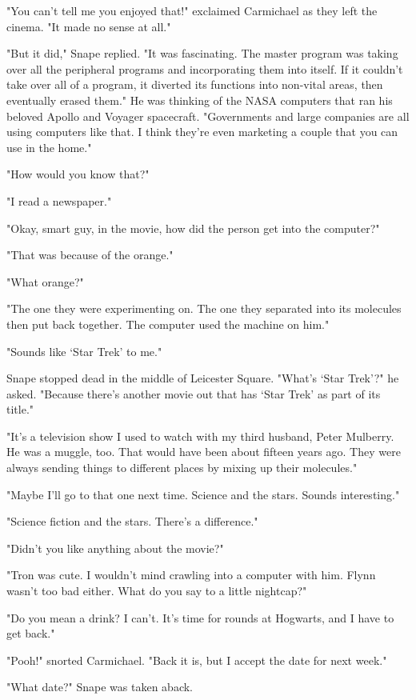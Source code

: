 \documentclass[a4paper,11pt]{article}
\begin{document}
"You can't tell me you enjoyed that!" exclaimed Carmichael as they left the cinema. "It made no sense at all."

"But it did," Snape replied. "It was fascinating. The master program was taking over all the peripheral programs and incorporating them into itself. If it couldn't take over all of a program, it diverted its functions into non-vital areas, then eventually erased them." He was thinking of the NASA computers that ran his beloved Apollo and Voyager spacecraft. "Governments and large companies are all using computers like that. I think they're even marketing a couple that you can use in the home."

"How would you know that?"

"I read a newspaper."

"Okay, smart guy, in the movie, how did the person get into the computer?"

"That was because of the orange."

"What orange?"

"The one they were experimenting on. The one they separated into its molecules then put back together. The computer used the machine on him."

"Sounds like `Star Trek' to me."

Snape stopped dead in the middle of Leicester Square. "What's `Star Trek'?" he asked. "Because there's another movie out that has `Star Trek' as part of its title."

"It's a television show I used to watch with my third husband, Peter Mulberry. He was a muggle, too. That would have been about fifteen years ago. They were always sending things to different places by mixing up their molecules."

"Maybe I'll go to that one next time. Science and the stars. Sounds interesting."

"Science fiction and the stars. There's a difference."

"Didn't you like anything about the movie?"

"Tron was cute. I wouldn't mind crawling into a computer with him. Flynn wasn't too bad either. What do you say to a little nightcap?"

"Do you mean a drink? I can't. It's time for rounds at Hogwarts, and I have to get back."

"Pooh!" snorted Carmichael. "Back it is, but I accept the date for next week."

"What date?" Snape was taken aback.
\end{document}
